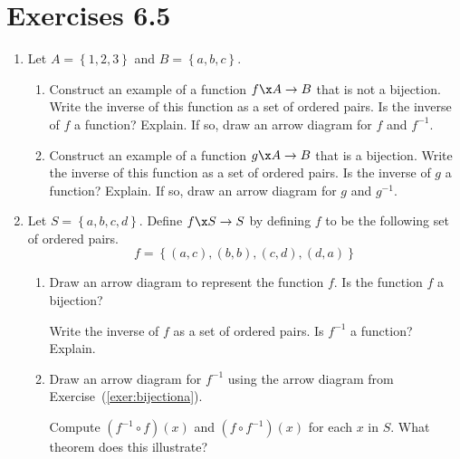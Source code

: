 \section*{Exercises 6.5}
%
\begin{enumerate}
\item Let  $A = \left\{ {1, 2, 3} \right\}$  and  $B = \left\{ {a, b, c} \right\}$. 
\label{exer:sec65-1}

\begin{enumerate}
  \item Construct an example of a function  $f\x A \to B$  that is not a bijection.  Write the inverse of this function as a set of ordered pairs.  Is the inverse of  $f$  a function?  Explain.  If so, draw an arrow diagram for  $f$  and  $f^{ - 1} $.

  \item Construct an example of a function  $g\x A \to B$  that is a bijection.  Write the inverse of this function as a set of ordered pairs.  Is the inverse of  $g$  a function?  Explain. If so, draw an arrow diagram for  $g$  and  $g^{ - 1} $.
\end{enumerate}

\item Let  $S = \left\{ {a, b, c, d} \right\}$.  Define  $f\x S \to S$ by defining  $f$  to be the following set of ordered pairs. \label{exer:sec65-2}
\[
f = \left\{ {( {a, c} ), ( {b, b} ), ( {c, d} ), ( {d, a} )} \right\}
\]
\begin{enumerate}
  \item Draw an arrow diagram to represent the function  $f$.  Is the function  $f$  a bijection? \label{exer:bijectiona}

  \yitem Write the inverse of  $f$ as a set of ordered pairs.  Is  $f^{ - 1} $
  a function?  Explain.

  \item Draw an arrow diagram for  $f^{ - 1} $  using the arrow diagram from Exercise~(\ref{exer:bijectiona}).

  \yitem Compute  $\left( {f^{ - 1}  \circ f} \right)( x )$  and  
$\left( {f \circ f^{ - 1} } \right)( x )$ for each  $x$ in  $S$.  What theorem does this illustrate?
\end{enumerate}


\end{enumerate}
